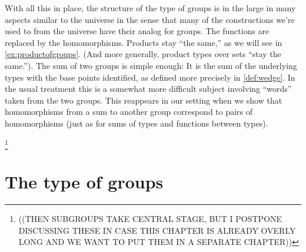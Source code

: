 With all this in place, the structure of the type of groups is in the large in many aspects similar to the universe in the sense that many of the constructions we're used to from the universe have their analog for groups.
The functions are replaced by the homomorphisms.
Products stay ``the same,'' as we will see in \cref{ex:productofgroups}.
(And more generally, product types over sets ``stay the same.'').
The sum of two groups is simple enough:
It is the sum of the underlying types with the base points identified, as defined more precisely in \cref{def:wedge}.
In the usual treatment this is a somewhat more difficult subject involving ``words'' taken from the two groups.
This reappears in our setting when we show that homomorphisms
from a sum to another group
correspond to pairs of homomorphisms
(just as for sums of types and functions between types).

\footnote{((THEN SUBGROUPS TAKE CENTRAL STAGE, BUT I POSTPONE DISCUSSING THESE IN CASE THIS CHAPTER IS ALREADY OVERLY LONG AND WE WANT TO PUT THEM IN A SEPARATE CHAPTER))}

   


\section{The type of groups}
\label{sec:typegroup}

